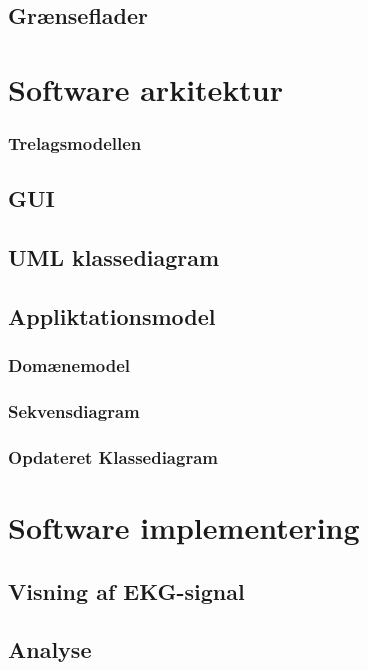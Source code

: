 \subsection{Grænseflader}

\section{Software arkitektur}


\subsubsection{Trelagsmodellen}

\subsection{GUI}

\subsection{UML klassediagram}


\subsection{Appliktationsmodel}
 

\subsubsection{Domænemodel}

\subsubsection{Sekvensdiagram}

\subsubsection{Opdateret Klassediagram}

\section{Software implementering}
 
\subsection{Visning af EKG-signal}

\subsection{Analyse}

